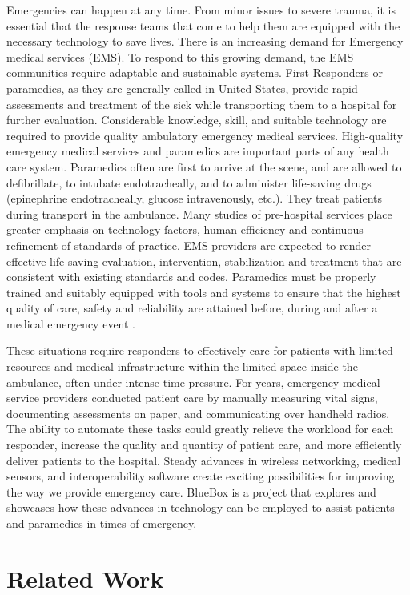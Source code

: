 Emergencies can happen at any time. From minor issues to severe
trauma, it is essential that the response teams that come to help
them are equipped with the necessary technology to save lives. There
is an increasing demand for Emergency medical services (EMS). To
respond to this growing demand, the EMS communities require adaptable
and sustainable systems. First Responders or paramedics, as they are
generally called in United States, provide rapid assessments and
treatment of the sick while transporting them to a hospital for
further evaluation. Considerable knowledge, skill, and suitable
technology are required to provide quality ambulatory emergency
medical services. High-quality emergency medical services and
paramedics are important parts of any health care system. Paramedics
often are first to arrive at the scene, and are allowed to
defibrillate, to intubate endotracheally, and to administer
life-saving drugs (epinephrine endotracheally, glucose intravenously,
etc.). They treat patients during transport in the ambulance. Many
studies of pre-hospital services place greater emphasis on technology
factors, human efficiency and continuous refinement of standards of
practice. EMS providers are expected to render effective life-saving
evaluation, intervention, stabilization and treatment that are
consistent with existing standards and codes. Paramedics must be
properly trained and suitably equipped with tools and systems to
ensure that the highest quality of care, safety and reliability are
attained before, during and after a medical emergency event
\cite{EMS, EMS1, EMS2, EMS3}.

These situations require responders to effectively care for patients
with limited resources and medical infrastructure within the limited
space inside the ambulance, often under intense time pressure. For
years, emergency medical service providers conducted patient care by
manually measuring vital signs, documenting assessments on paper, and
communicating over handheld radios. The ability to automate these
tasks could greatly relieve the workload for each responder, increase
the quality and quantity of patient care, and more efficiently
deliver patients to the hospital.  Steady advances in wireless
networking, medical sensors, and interoperability software create
exciting possibilities for improving the way we provide emergency
care. BlueBox is a project that explores and showcases how these
advances in technology can be employed to assist patients and
paramedics in times of emergency. 

\section{Related Work}

